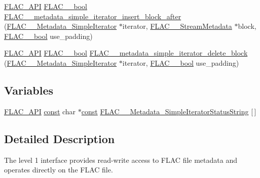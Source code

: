 \begin{DoxyCompactItemize}
\item 
\hyperlink{group__flac__export_ga56ca07df8a23310707732b1c0007d6f5}{F\+L\+A\+C\+\_\+\+A\+PI} \hyperlink{ordinals_8h_a95103469f1cbd78b8cf250194985b34e}{F\+L\+A\+C\+\_\+\+\_\+bool} \hyperlink{group__flac__metadata__level1_ga1239ccc5ae1dc3f7cb0e1a61707fafc6}{F\+L\+A\+C\+\_\+\+\_\+metadata\+\_\+simple\+\_\+iterator\+\_\+insert\+\_\+block\+\_\+after} (\hyperlink{group__flac__metadata__level1_ga6accccddbb867dfc2eece9ee3ffecb3a}{F\+L\+A\+C\+\_\+\+\_\+\+Metadata\+\_\+\+Simple\+Iterator} $\ast$iterator, \hyperlink{struct_f_l_a_c_____stream_metadata}{F\+L\+A\+C\+\_\+\+\_\+\+Stream\+Metadata} $\ast$block, \hyperlink{ordinals_8h_a95103469f1cbd78b8cf250194985b34e}{F\+L\+A\+C\+\_\+\+\_\+bool} use\+\_\+padding)
\item 
\hyperlink{group__flac__export_ga56ca07df8a23310707732b1c0007d6f5}{F\+L\+A\+C\+\_\+\+A\+PI} \hyperlink{ordinals_8h_a95103469f1cbd78b8cf250194985b34e}{F\+L\+A\+C\+\_\+\+\_\+bool} \hyperlink{group__flac__metadata__level1_gaf0a1823f95f8097f0d2ff3f67ae30a88}{F\+L\+A\+C\+\_\+\+\_\+metadata\+\_\+simple\+\_\+iterator\+\_\+delete\+\_\+block} (\hyperlink{group__flac__metadata__level1_ga6accccddbb867dfc2eece9ee3ffecb3a}{F\+L\+A\+C\+\_\+\+\_\+\+Metadata\+\_\+\+Simple\+Iterator} $\ast$iterator, \hyperlink{ordinals_8h_a95103469f1cbd78b8cf250194985b34e}{F\+L\+A\+C\+\_\+\+\_\+bool} use\+\_\+padding)
\end{DoxyCompactItemize}
\subsection*{Variables}
\begin{DoxyCompactItemize}
\item 
\hyperlink{group__flac__export_ga56ca07df8a23310707732b1c0007d6f5}{F\+L\+A\+C\+\_\+\+A\+PI} \hyperlink{zconf_8h_a2c212835823e3c54a8ab6d95c652660e}{const} char $\ast$\hyperlink{zconf_8h_a2c212835823e3c54a8ab6d95c652660e}{const} \hyperlink{group__flac__metadata__level1_ga28ea4a13fcbe97a732fafb13417036bb}{F\+L\+A\+C\+\_\+\+\_\+\+Metadata\+\_\+\+Simple\+Iterator\+Status\+String} \mbox{[}$\,$\mbox{]}
\end{DoxyCompactItemize}


\subsection{Detailed Description}
The level 1 interface provides read-\/write access to F\+L\+AC file metadata and operates directly on the F\+L\+AC file. 

